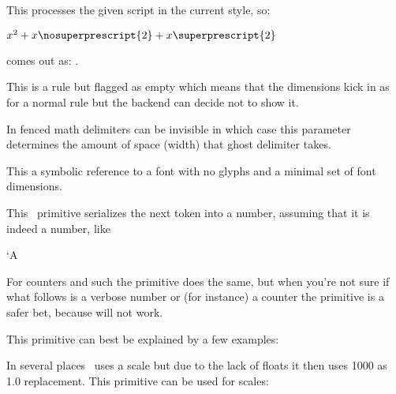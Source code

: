 This processes the given script in the current style, so:

\startbuffer
$ x^2 + x\nosuperprescript{2} + x\superprescript{2} $
\stopbuffer

comes out as: \inlinebuffer.

\stopnewprimitive

\startnewprimitive[title={\prm {novrule}}]

This is a rule but flagged as empty which means that the dimensions kick in as
for a normal rule but the backend can decide not to show it.

\stopnewprimitive

\startoldprimitive[title={\prm {nulldelimiterspace}}]

In fenced math delimiters can be invisible in which case this parameter
determines the amount of space (width) that ghost delimiter takes.

\stopoldprimitive

\startoldprimitive[title={\prm {nullfont}}]

This a symbolic reference to a font with no glyphs and a minimal set of font
dimensions.

\stopoldprimitive

\startoldprimitive[title={\prm {number}}]

This \TEX\ primitive serializes the next token into a number, assuming that it
is indeed a number, like

\starttyping
\number`A
\number\scratchcounter
\stoptyping

For counters and such the  primitive does the same, but when you're
not sure if what follows is a verbose number or (for instance) a counter the
 primitive is a safer bet, because  will not work.

\stopoldprimitive

\startnewprimitive[title={\prm {numericscale}}]

This primitive can best be explained by a few examples:

\startbuffer
\the{}
\the{}
\the{}
\the{}
\stopbuffer

\typebuffer

In several places \TEX\ uses a scale but due to the lack of floats it then uses
1000 as 1.0 replacement. This primitive can be used for  scales:

\startlines \getbuffer \stoplines

